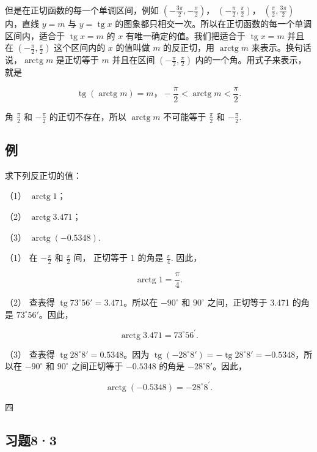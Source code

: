 但是在正切函数的每一个单调区间，例如
\(\left(-\frac{3\pi}{2}, -\frac{\pi}{2}\right)\)，
\(\left(-\frac{\pi}{2}, \frac{\pi}{2}\right)\)，
\(\left(\frac{\pi}{2}, \frac{3\pi}{2}\right)\)
内，直线 \(y = m\) 与 \(y = \operatorname{tg} x\)
的图象都只相交一次。所以在正切函数的每一个单调区间内，适合于
\(\operatorname{tg} x = m\) 的 \(x\) 有唯一确定的值。我们把适合于
\(\operatorname{tg} x = m\) 并且在
\(\left(-\frac{\pi}{2}, \frac{\pi}{2}\right)\) 这个区间内的 \(x\)
的值叫做 \(m\) 的反正切，用 \(\operatorname{arctg} m\)
来表示。换句话说，\(\operatorname{arctg} m\) 是正切等于 \(m\) 并且在区间
\(\left(-\frac{\pi}{2}, \frac{\pi}{2}\right)\)
内的一个角。用式子来表示，就是

\[
\operatorname{tg} (\operatorname{arctg} m) = m\text{，} - \frac {\pi}{2} <   \operatorname{arctg} m <   \frac {\pi}{2}.
\]

 角 \(\frac{\pi}{2}\) 和 \(-\frac{\pi}{2}\)
的正切不存在，所以 \(\operatorname{arctg} m\) 不可能等于
\(\frac{\pi}{2}\) 和 \(-\frac{\pi}{2}\).

\subsection{例}

求下列反正切的值：

（1） \(\operatorname{arctg} 1\)；

（2） \(\operatorname{arctg} 3.471\)；

（3） \(\operatorname{arctg}(-0.5348)\).

 （1） 在 \(-\frac{\pi}{2}\) 和 \(\frac{\pi}{2}\) 间，
正切等于 1 的角是 \(\frac{\pi}{4}\). 因此，

\[
\operatorname{arctg} 1 = \frac {\pi}{4}.
\]

（2） 查表得 \(\operatorname{tg} 73^{\circ} 56' = 3.471\)。所以在
\(-90^{\circ}\) 和 \(90^{\circ}\) 之间，正切等于 3.471 的角是
\(73^{\circ} 56'\)。因此，

\[
\operatorname{arctg} 3.471 = 73 ^{\circ} 56 ^{\prime}.
\]

（3） 查表得 \(\operatorname{tg} 28^{\circ} 8' = 0.5348\)。因为
\(\operatorname{tg} (-28^{\circ} 8') = -\operatorname{tg} 28^{\circ} 8' = -0.5348\)，所以在
\(-90^{\circ}\) 和 \(90^{\circ}\) 之间正切等于 \(-0.5348\) 的角是
\(-28^{\circ} 8'\)。因此，

\[
\operatorname{arctg} (- 0.5348) = - 28 ^{\circ} 8 ^{\prime}.
\]

四

\subsection{习题8·3}

